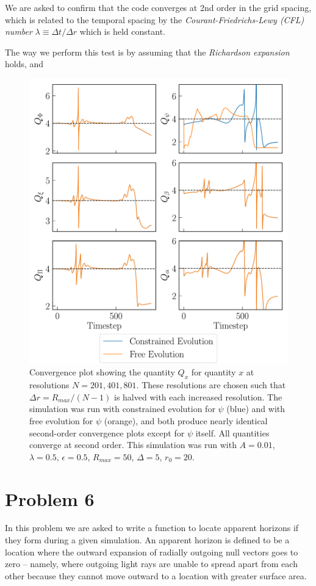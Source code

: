 \documentclass[12pt]{article}
\numberwithin{equation}{section}
\begin{document}
We are asked to confirm that the code converges at 2nd order in the grid spacing, which is related to the temporal spacing by the \textit{Courant-Friedrichs-Lewy (CFL) number} $\lambda \equiv \Delta t / \Delta r$ which is held constant.

The way we perform this test is by assuming that the \textit{Richardson expansion} holds, and 

\begin{figure}
	\includegraphics[width=\textwidth]{conv_plot.pdf}
	\caption{Convergence plot showing the quantity $Q_x$ for quantity $x$ at resolutions $N = 201, 401, 801$.  These resolutions are chosen such that $\Delta r = R_{max}/(N-1)$ is halved with each increased resolution.  The simulation was run with constrained evolution for $\psi$ (blue) and with free evolution for $\psi$ (orange), and both produce nearly identical second-order convergence plots except for $\psi$ itself.  All quantities converge at second order.  This simulation was run with $A = 0.01$, $\lambda = 0.5$, $\epsilon = 0.5$, $R_{max}=50$, $\Delta = 5$, $r_0 = 20$.}
\end{figure}


\section{Problem 6}
In this problem we are asked to write a function to locate apparent horizons if they form during a given simulation.  An apparent horizon is defined to be a location where the outward expansion of radially outgoing null vectors goes to zero -- namely, where outgoing light rays are unable to spread apart from each other because they cannot move outward to a location with greater surface area.  
\end{document}
